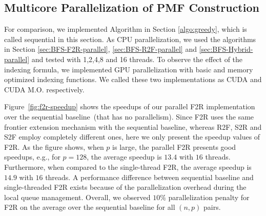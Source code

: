 \documentclass[12pt]{article}
\newcommand{\comment}[2]{{\color{red}{\bf (#1: #2)}}}
\begin{document}
\subsection{Multicore Parallelization of PMF Construction}

For comparison, we implemented Algorithm in Section \ref{algo:greedy}, which is called sequential in this section. As CPU parallelization, we used the algorithms in Section \ref{sec:BFS-F2R-parallel}, \ref{sec:BFS-R2F-parallel} and \ref{sec:BFS-Hybrid-parallel} and tested with 1,2,4,8 and 16 threads. To observe the effect of the indexing formula, we implemented GPU parallelization with basic and memory optimized indexing functions. We called these two implementations as CUDA and CUDA M.O. respectively.

Figure~\ref{fig:f2r-speedup} shows the speedups of our parallel F2R implementation over the sequential baseline~(that has no parallelism). Since F2R uses the same frontier extension mechanism with the sequential baseline, whereas R2F, S2R and S2F employ completely different ones, here we only present the speedup values of F2R. As the figure shows, when $p$ is large, the parallel F2R presents good speedups, e.g., for $p = 128$, the average speedup is $13.4$ with $16$ threads. Furthermore, when compared to the single-thread F2R, the average speedup is $14.9$ with $16$ threads. A performance difference between sequential baseline and single-threaded F2R exists because of the parallelization overhead during the local queue management. Overall, we observed $10\%$ parallelization penalty for F2R on the average over the sequential baseline for all $(n, p)$ pairs. \comment{sertac}{penalty hesaplarken sadece 1 threadle mi karsilastirmak lazim?}
\end{document}
